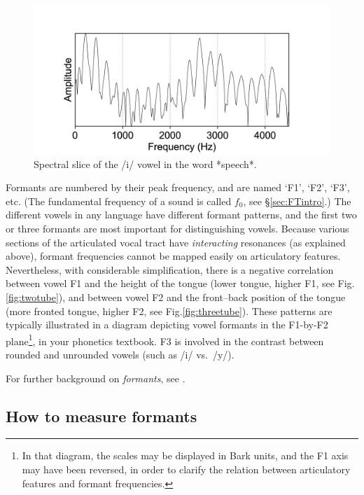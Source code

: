 \documentclass[
]{book}
\begin{document}
\begin{figure}

{\centering \includegraphics{figures/speech_word_0_210_spectrum} 

}

\caption{Spectral slice of the /i/ vowel in the word *speech*.}\label{fig:speech-spectralslice-i}
\end{figure}

Formants are numbered by their peak frequency, and are named `F1', `F2', `F3', etc. (The fundamental frequency of a sound is called \(f_0\), see §\ref{sec:FTintro}.)
The different vowels in any language have different formant patterns, and the first two or three formants are most important for distinguishing vowels. Because various sections of the articulated vocal tract have \emph{interacting} resonances (as explained above), formant frequencies cannot be mapped easily on articulatory features. Nevertheless, with considerable simplification, there is a negative correlation between vowel F1 and the height of the tongue (lower tongue, higher F1, see Fig.\ref{fig:twotube}), and between vowel F2 and the front--back position of the tongue (more fronted tongue, higher F2, see Fig.\ref{fig:threetube}). These patterns are typically illustrated in a diagram depicting vowel formants in the F1-by-F2 plane\footnote{In that diagram, the scales may be displayed in Bark units, and the F1 axis may have been reversed, in order to clarify the relation between articulatory features and formant frequencies.}, in your phonetics textbook. F3 is involved in the contrast between rounded and unrounded vowels (such as /i/ vs.~/y/).

For further background on \emph{formants}, see \citet{Aalto_Malinen_Vainio_2018}.

\label{box-praatformants}
\subsection{How to measure formants}\label{sec:measureformants}
\end{document}
